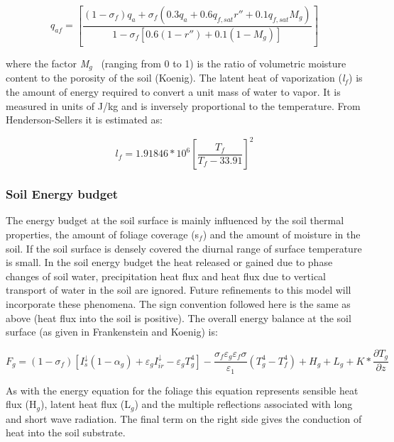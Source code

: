\begin{equation}
{q_{af}} = \left[ {\frac{{\left( {1 - {\sigma_f}} \right){q_a} + {\sigma_f}\left( {0.3{q_a} + 0.6{q_{f,sat}}{r''} + 0.1{q_{f,sat}}{M_g}} \right)}}{{1 - {\sigma_f}\left[ {0.6\left( {1 - {r''}} \right) + 0.1\left( {1 - {M_g}} \right)} \right]}}} \right]
\end{equation}

where the factor \emph{M\(_{g}\)} ~(ranging from 0 to 1) is the ratio of volumetric moisture content to the porosity of the soil (Koenig). The latent heat of vaporization (\emph{l\(_{f}\)}) is the amount of energy required to convert a unit mass of water to vapor. It is measured in units of J/kg and is inversely proportional to the temperature. From Henderson-Sellers it is estimated as:

\begin{equation}
{l_f} = 1.91846*{10^6}{\left[ {\frac{{{T_f}}}{{{T_f} - 33.91}}} \right]^2}
\end{equation}

\subsubsection{Soil Energy budget}\label{soil-energy-budget}

The energy budget at the soil surface is mainly influenced by the soil thermal properties, the amount of foliage coverage (s\(_{f}\)) and the amount of moisture in the soil. If the soil surface is densely covered the diurnal range of surface temperature is small. In the soil energy budget the heat released or gained due to phase changes of soil water, precipitation heat flux and heat flux due to vertical transport of water in the soil are ignored. Future refinements to this model will incorporate these phenomena. The sign convention followed here is the same as above (heat flux into the soil is positive). The overall energy balance at the soil surface (as given in Frankenstein and Koenig) is:

\begin{equation}
{F_g} = (1 - {\sigma_f})\left[ {I_s^ \downarrow (1 - {\alpha_g}) + {\varepsilon_g}I_{ir}^ \downarrow  - {\varepsilon_g}T_g^4} \right] - \frac{{{\sigma_f}{\varepsilon_g}{\varepsilon_f}\sigma }}{{{\varepsilon_1}}}\left( {T_g^4 - T_f^4} \right) + {H_g} + {L_g} + K*\frac{{\partial {T_g}}}{{\partial z}}
\end{equation}

As with the energy equation for the foliage this equation represents sensible heat flux (H\(_{g}\)), latent heat flux (L\(_{g}\)) and the multiple reflections associated with long and short wave radiation. The final term on the right side gives the conduction of heat into the soil substrate.


